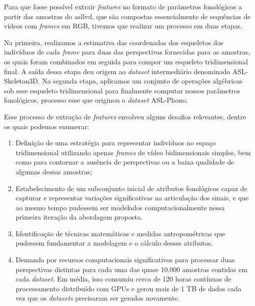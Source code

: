 Para que fosse possível extrair \textit{features} no formato de parâmetros fonológicos a partir das amostras do \acrshort{asllvd}, que são compostas essencialmente de sequências de vídeos com \textit{frames} em RGB, tivemos que realizar um processo em duas etapas.

Na primeira, realizamos a estimativa das coordenadas dos esqueletos dos indivíduos de cada \textit{frame} para duas das perspectivas fornecidas para as amostras, os quais foram combinados em seguida para compor um esqueleto tridimensional final. A saída dessa etapa deu origem ao \textit{dataset} intermediário denominado ASL-Skeleton3D.
Na segunda etapa, aplicamos um conjunto de operações algébricas sob esse esqueleto tridimensional para finalmente computar nossos parâmetros fonológicos, processo esse que originou o \textit{dataset} ASL-Phono.


Esse processo de extração de \textit{features} envolveu alguns desafios relevantes, dentre os quais podemos enumerar:

\begin{enumerate}
    \item Definição de uma estratégia para representar indivíduos no espaço tridimensional utilizando apenas \textit{frames} de vídeo bidimensionais simples, bem como para contornar a ausência de perspectivas ou a baixa qualidade de algumas dessas amostras;

    \item Estabelecimento de um subconjunto inicial de atributos fonológicos capaz de capturar e representar variações significativas na articulação dos sinais, e que ao mesmo tempo pudessem ser modelados computacionalmente nessa primeira iteração da abordagem proposta.

    \item Identificação de técnicas matemáticas e medidas antropométricas que pudessem fundamentar a modelagem e o cálculo desses atributos.

    \item Demanda por recursos computacionais significativos para processar duas perspectivas distintas para cada uma das quase 10.000 amostras contidas em cada \textit{dataset}. Em média, isso consumiu cerca de 120 horas contínuas de processamento distribuído com GPUs e gerou mais de 1 TB de dados cada vez que os \textit{datasets} precisaram ser gerados novamente.
\end{enumerate}





